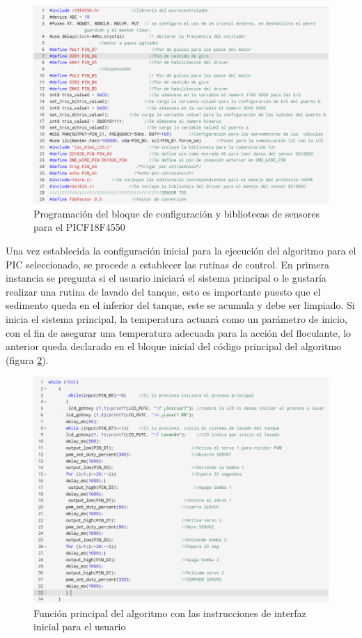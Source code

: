 \documentclass[conference]{IEEEtran}
\begin{document}
\begin{figure}[htbp]
	\centering
	\includegraphics[width=0.9\columnwidth]{fig17.png}
	\caption{Programación del bloque de configuración y bibliotecas de sensores para el PICF18F4550}
	\label{fig:17}
\end{figure}

Una vez establecida la configuración inicial para la ejecución del algoritmo para el PIC seleccionado, se procede a establecer las rutinas de control. En primera instancia se pregunta si el usuario iniciará el sistema principal o le gustaría realizar una rutina de lavado del tanque, esto es importante puesto que el sedimento queda en el inferior del tanque, este se acumula y debe ser limpiado. Si inicia el sistema principal, la temperatura actuará como un parámetro de inicio, con el fin de asegurar una temperatura adecuada para la acción del floculante, lo anterior queda declarado en el bloque inicial del código principal del algoritmo (figura \ref{fig:18}).

\begin{figure}[htbp]
	\centering
	\includegraphics[width=0.9\columnwidth]{fig18.png}
	\caption{Función principal del algoritmo con las instrucciones de interfaz inicial para el usuario}
	\label{fig:18}
\end{figure}
\end{document}
